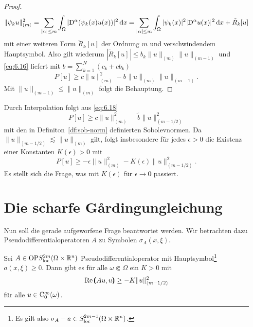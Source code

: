 \begin{proof}
\begin{equation}
   \|\psi_k u\|_{(m)}^2 =  \sum_{|\alpha|\le m} \int_\Omega |\mathrm D^\alpha (\psi_k(x) u(x)) |^2 \,\mathrm d x
   =   \sum_{|\alpha|\le m} \int_\Omega  |\psi_k(x)|^2  |\mathrm D^\alpha u(x) |^2 \,\mathrm d x + \tilde R_k[u]
\end{equation}
mit einer weiteren Form $\tilde R_k[u]$  der Ordnung $m$ und verschwindendem Hauptsymbol. Also gilt wiederum $|\tilde R_k[u]|\le b_k \|u\|_{(m)}\|u\|_{(m-1)}$ und  \eqref{eq:6.16} liefert mit $b= \sum_{k=1}^N (c_k + c b_k  )$
\begin{equation}\label{eq:6.18}
P[u] \ge c \|u\|_{(m)}^2 - b \|u\|_{(m)}\|u\|_{(m-1)} .
\end{equation}
Mit $\|u\|_{(m-1)}\le \|u\|_{(m)}$ folgt die Behauptung.
\end{proof}

\begin{rem} 
Durch Interpolation folgt aus \eqref{eq:6.18}
\begin{equation}
P[u] \ge c \|u\|_{(m)}^2 - \tilde b \|u\|_{(m-1/2)}^2
\end{equation}
mit den in Definiton~\ref{df:sob-norm} definierten Sobolevnormen. Da $\|u\|_{(m-1/2)} \lesssim \|u\|_{(m)}$ gilt, folgt insbesondere für jedes $\epsilon>0$
die Existenz einer Konstanten $K(\epsilon)>0$ mit
\begin{equation}
P[u] \ge -\epsilon \|u\|_{(m)}^2 - K(\epsilon) \|u\|_{(m-1/2)}^2.
\end{equation}
Es stellt sich die Frage, was mit $K(\epsilon)$ für $\epsilon\to0$ passiert. 
\end{rem}

\section{Die scharfe G\r{a}rdingungleichung}

Nun soll die gerade aufgeworfene Frage beantwortet werden. Wir betrachten dazu Pseudodifferentialoperatoren $A$ zu Symbolen $\sigma_A(x,\xi)$.

\begin{thm}
Sei $A\in {\rm OP}S^{2m}_{\rm loc}(\Omega\times\mathbb R^n)$ Pseudodifferentialoperator mit Hauptsymbol\footnote{Es gilt also $\sigma_A-a\in S^{2m-1}_{\rm loc}(\Omega\times\mathbb R^n)$.} $a(x,\xi)\ge0$. Dann gibt es  für alle $\omega\Subset \Omega$ ein $K>0$ mit
 \begin{equation}
    \operatorname{Re} \pmb(Au,u\pmb) \ge - K \|u\|_{(m-1/2)}^2 
 \end{equation}
 für alle $u\in\mathrm C_0^\infty(\omega)$.
\end{thm}

